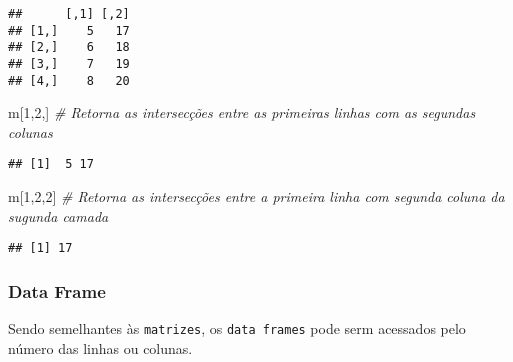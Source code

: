 \documentclass[
]{book}
\newenvironment{Shaded}{\begin{snugshade}}{\end{snugshade}}
\newcommand{\CommentTok}[1]{\textcolor[rgb]{0.56,0.35,0.01}{\textit{#1}}}
\newcommand{\DecValTok}[1]{\textcolor[rgb]{0.00,0.00,0.81}{#1}}
\newcommand{\NormalTok}[1]{#1}
\begin{document}
\begin{verbatim}
##      [,1] [,2]
## [1,]    5   17
## [2,]    6   18
## [3,]    7   19
## [4,]    8   20
\end{verbatim}

\begin{Shaded}
\begin{Highlighting}[]
\NormalTok{m[}\DecValTok{1}\NormalTok{,}\DecValTok{2}\NormalTok{,] }\CommentTok{\# Retorna as intersecções entre as primeiras linhas com as segundas colunas}
\end{Highlighting}
\end{Shaded}

\begin{verbatim}
## [1]  5 17
\end{verbatim}

\begin{Shaded}
\begin{Highlighting}[]
\NormalTok{m[}\DecValTok{1}\NormalTok{,}\DecValTok{2}\NormalTok{,}\DecValTok{2}\NormalTok{] }\CommentTok{\# Retorna as intersecções entre a primeira linha com segunda coluna da sugunda camada}
\end{Highlighting}
\end{Shaded}

\begin{verbatim}
## [1] 17
\end{verbatim}

\hypertarget{data-frame-1}{%
\subsubsection{Data Frame}\label{data-frame-1}}

Sendo semelhantes às \texttt{matrizes}, os \texttt{data\ frames} pode serm acessados pelo número das linhas ou colunas.
\end{document}
